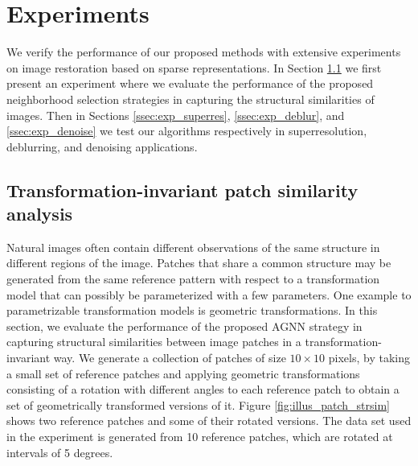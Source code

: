 \documentclass[journal]{IEEEtran}
\begin{document}
\section{Experiments}
\label{sec:experiments}

We verify the performance of our proposed methods with extensive experiments  
on image restoration based on sparse representations. In Section \ref{ssec:exp_struc_sim} we first present an experiment where we evaluate the performance of the proposed neighborhood selection strategies in capturing the structural similarities of images.  Then in Sections \ref{ssec:exp_superres}, \ref{ssec:exp_deblur}, and \ref{ssec:exp_denoise} we test our algorithms respectively in superresolution, deblurring, and denoising applications.


\subsection{Transformation-invariant patch similarity analysis}
\label{ssec:exp_struc_sim}

Natural images often contain different observations of the same structure in different regions of the image. Patches that share a common structure may be generated from the same reference pattern with respect to a transformation model that can possibly be parameterized with a few parameters. One example to parametrizable transformation models is geometric transformations. In this section, we evaluate the performance of the proposed AGNN strategy in capturing structural similarities between image patches in a transformation-invariant way. We generate a collection of patches of size $10 \times 10 $ pixels, by taking a small set of reference patches and applying  geometric transformations consisting of a rotation with different angles to each reference patch to obtain a set of geometrically transformed versions of it. Figure \ref{fig:illus_patch_strsim} shows two reference patches and some of their rotated versions. The data set used in the experiment is generated from 10 reference patches, which are rotated at intervals of 5 degrees.
\end{document}
